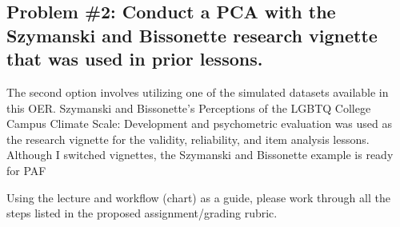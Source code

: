 \documentclass[
  english,
]{book}
\begin{document}
\hypertarget{problem-2-conduct-a-pca-with-the-szymanski-and-bissonette--szymanski_perceptions_2020-research-vignette-that-was-used-in-prior-lessons.-1}{%
\subsection{\texorpdfstring{Problem \#2: Conduct a PCA with the Szymanski and Bissonette \citeyearpar{szymanski_perceptions_2020} research vignette that was used in prior lessons.}{Problem \#2: Conduct a PCA with the Szymanski and Bissonette {[}-@szymanski\_perceptions\_2020{]} research vignette that was used in prior lessons.}}\label{problem-2-conduct-a-pca-with-the-szymanski-and-bissonette--szymanski_perceptions_2020-research-vignette-that-was-used-in-prior-lessons.-1}}

The second option involves utilizing one of the simulated datasets available in this OER. Szymanski and Bissonette's \citeyearpar{szymanski_perceptions_2020}Perceptions of the LGBTQ College Campus Climate Scale: Development and psychometric evaluation was used as the research vignette for the validity, reliability, and item analysis lessons. Although I switched vignettes, the Szymanski and Bissonette example is ready for PAF

Using the lecture and workflow (chart) as a guide, please work through all the steps listed in the proposed assignment/grading rubric.
\end{document}
